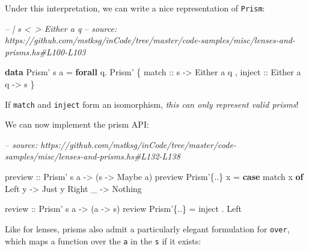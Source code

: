 \documentclass[]{article}
\newenvironment{Shaded}{}{}
\newcommand{\CommentTok}[1]{\textcolor[rgb]{0.38,0.63,0.69}{\textit{#1}}}
\newcommand{\DataTypeTok}[1]{\textcolor[rgb]{0.56,0.13,0.00}{#1}}
\newcommand{\FunctionTok}[1]{\textcolor[rgb]{0.02,0.16,0.49}{#1}}
\newcommand{\KeywordTok}[1]{\textcolor[rgb]{0.00,0.44,0.13}{\textbf{#1}}}
\newcommand{\NormalTok}[1]{#1}
\newcommand{\OtherTok}[1]{\textcolor[rgb]{0.00,0.44,0.13}{#1}}
\begin{document}
Under this interpretation, we can write a nice representation of
\texttt{Prism\textquotesingle{}}:

\begin{Shaded}
\begin{Highlighting}[]
\CommentTok{-- | s <~> Either a q}
\CommentTok{-- source: https://github.com/mstksg/inCode/tree/master/code-samples/misc/lenses-and-prisms.hs#L100-L103}

\KeywordTok{data} \DataTypeTok{Prism'}\NormalTok{ s a }\FunctionTok{=} \KeywordTok{forall}\NormalTok{ q}\FunctionTok{.} \DataTypeTok{Prism'}
\NormalTok{    \{}\OtherTok{ match  ::}\NormalTok{ s }\OtherTok{->} \DataTypeTok{Either}\NormalTok{ a q}
\NormalTok{    ,}\OtherTok{ inject ::} \DataTypeTok{Either}\NormalTok{ a q }\OtherTok{->}\NormalTok{ s}
\NormalTok{    \}}
\end{Highlighting}
\end{Shaded}

If \texttt{match} and \texttt{inject} form an isomorphism, \emph{this can only
represent valid prisms}!

We can now implement the prism API:

\begin{Shaded}
\begin{Highlighting}[]
\CommentTok{-- source: https://github.com/mstksg/inCode/tree/master/code-samples/misc/lenses-and-prisms.hs#L132-L138}

\OtherTok{preview ::} \DataTypeTok{Prism'}\NormalTok{ s a }\OtherTok{->}\NormalTok{ (s }\OtherTok{->} \DataTypeTok{Maybe}\NormalTok{ a)}
\NormalTok{preview }\DataTypeTok{Prism'}\NormalTok{\{}\FunctionTok{..}\NormalTok{\} x }\FunctionTok{=} \KeywordTok{case}\NormalTok{ match x }\KeywordTok{of}
    \DataTypeTok{Left}\NormalTok{  y }\OtherTok{->} \DataTypeTok{Just}\NormalTok{ y}
    \DataTypeTok{Right}\NormalTok{ _ }\OtherTok{->} \DataTypeTok{Nothing}

\OtherTok{review  ::} \DataTypeTok{Prism'}\NormalTok{ s a }\OtherTok{->}\NormalTok{ (a }\OtherTok{->}\NormalTok{ s)}
\NormalTok{review }\DataTypeTok{Prism'}\NormalTok{\{}\FunctionTok{..}\NormalTok{\} }\FunctionTok{=}\NormalTok{ inject }\FunctionTok{.} \DataTypeTok{Left}
\end{Highlighting}
\end{Shaded}

Like for lenses, prisms also admit a particularly elegant formulation for
\texttt{over}, which maps a function over the \texttt{a} in the \texttt{s} if it
exists:
\end{document}
